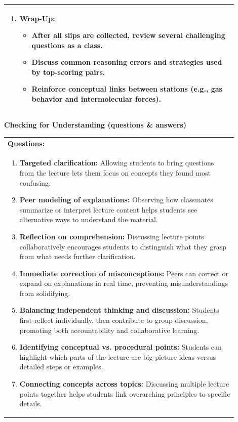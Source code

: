 \documentclass{article}
\begin{document}
{{\begin{tabular}{|p{0.9\linewidth}|}
\begin{enumerate}
    \item \textbf{Wrap-Up:}
    \begin{itemize}
        \item After all slips are collected, review several challenging questions as a class.
        \item Discuss common reasoning errors and strategies used by top-scoring pairs.
        \item Reinforce conceptual links between stations (e.g., gas behavior and intermolecular forces).
    \end{itemize}
\end{enumerate}
\\
\hline
\end{tabular}



\newpage
\noindent
{\large\textbf{Checking for Understanding (questions \& answers)}}\\[0.2em]
\noindent
\begin{tabular}{|p{0.9\linewidth}|}
\hline
\textbf{Questions:} \\
\begin{enumerate}
    \item \textbf{Targeted clarification:} Allowing students to bring questions from the lecture lets them focus on concepts they found most confusing.
    \item \textbf{Peer modeling of explanations:} Observing how classmates summarize or interpret lecture content helps students see alternative ways to understand the material.
    \item \textbf{Reflection on comprehension:} Discussing lecture points collaboratively encourages students to distinguish what they grasp from what needs further clarification.
    \item \textbf{Immediate correction of misconceptions:} Peers can correct or expand on explanations in real time, preventing misunderstandings from solidifying.
    \item \textbf{Balancing independent thinking and discussion:} Students first reflect individually, then contribute to group discussion, promoting both accountability and collaborative learning.
    \item \textbf{Identifying conceptual vs. procedural points:} Students can highlight which parts of the lecture are big-picture ideas versus detailed steps or examples.
    \item \textbf{Connecting concepts across topics:} Discussing multiple lecture points together helps students link overarching principles to specific details.

\end{enumerate}
\end{tabular}}}
\end{document}
